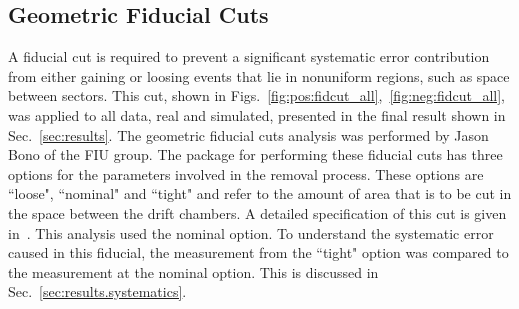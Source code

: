 \subsection{Geometric Fiducial Cuts}\label{sec:analysis.fid_cuts}

 A fiducial cut is required to prevent a significant systematic error contribution from either gaining or loosing events that lie in nonuniform regions, such as space between sectors. This cut, shown in Figs.~\ref{fig:pos:fidcut_all},~\ref{fig:neg:fidcut_all}, was applied to all data, real and simulated, presented in the final result shown in Sec.~\ref{sec:results}. The geometric fiducial cuts analysis was performed by Jason Bono of the FIU group. The package for performing these fiducial cuts has three options for the parameters involved in the removal process. These options are ``loose", ``nominal" and ``tight" and refer to the amount of area that is to be cut in the space between the drift chambers. A detailed specification of this cut is given in~\cite{clas.g12.note}. This analysis used the nominal option. To understand the systematic error caused in this fiducial, the measurement from the ``tight" option was compared to the measurement at the nominal option. This is discussed in Sec.~\ref{sec:results.systematics}.


